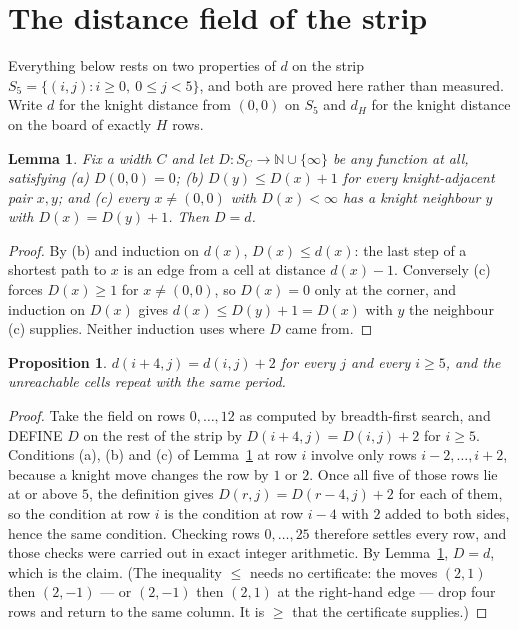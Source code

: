 \documentclass[11pt,a4paper]{article}
\theoremstyle{plain}
\newtheorem{lemma}[theorem]{Lemma}
\newtheorem{proposition}[theorem]{Proposition}
\theoremstyle{definition}
\begin{document}
\section{The distance field of the strip}

Everything below rests on two properties of $d$ on the strip $S_{5}=\{(i,j): i\ge 0,\ 0\le j<5\}$, and both are proved here rather than measured. Write $d$ for the knight distance from $(0,0)$ on $S_{5}$ and $d_H$ for the knight distance on the board of exactly $H$ rows.

\begin{lemma}\label{lem:bellman}
Fix a width $C$ and let $D:S_C\to\mathbb{N}\cup\{\infty\}$ be any function at all, satisfying
(a) $D(0,0)=0$; (b) $D(y)\le D(x)+1$ for every knight-adjacent pair $x,y$; and
(c) every $x\ne(0,0)$ with $D(x)<\infty$ has a knight neighbour $y$ with $D(x)=D(y)+1$. Then $D=d$.
\end{lemma}

\begin{proof}
By (b) and induction on $d(x)$, $D(x)\le d(x)$: the last step of a shortest path to $x$ is an edge from a cell at distance $d(x)-1$. Conversely (c) forces $D(x)\ge1$ for $x\ne(0,0)$, so $D(x)=0$ only at the corner, and induction on $D(x)$ gives $d(x)\le D(y)+1=D(x)$ with $y$ the neighbour (c) supplies. Neither induction uses where $D$ came from.
\end{proof}

\begin{proposition}\label{prop:period}
$d(i+4,j)=d(i,j)+2$ for every $j$ and every $i\ge5$, and the unreachable cells repeat with the same period.
\end{proposition}

\begin{proof}
Take the field on rows $0,\dots,12$ as computed by breadth-first search, and DEFINE $D$ on the rest of the strip by $D(i+4,j)=D(i,j)+2$ for $i\ge5$. Conditions (a), (b) and (c) of Lemma~\ref{lem:bellman} at row $i$ involve only rows $i-2,\dots,i+2$, because a knight move changes the row by $1$ or $2$. Once all five of those rows lie at or above $5$, the definition gives $D(r,j)=D(r-4,j)+2$ for each of them, so the condition at row $i$ is the condition at row $i-4$ with $2$ added to both sides, hence the same condition. Checking rows $0,\dots,25$ therefore settles every row, and those checks were carried out in exact integer arithmetic. By Lemma~\ref{lem:bellman}, $D=d$, which is the claim. (The inequality $\le$ needs no certificate: the moves $(2,1)$ then $(2,-1)$ --- or $(2,-1)$ then $(2,1)$ at the right-hand edge --- drop four rows and return to the same column. It is $\ge$ that the certificate supplies.)
\end{proof}
\end{document}
